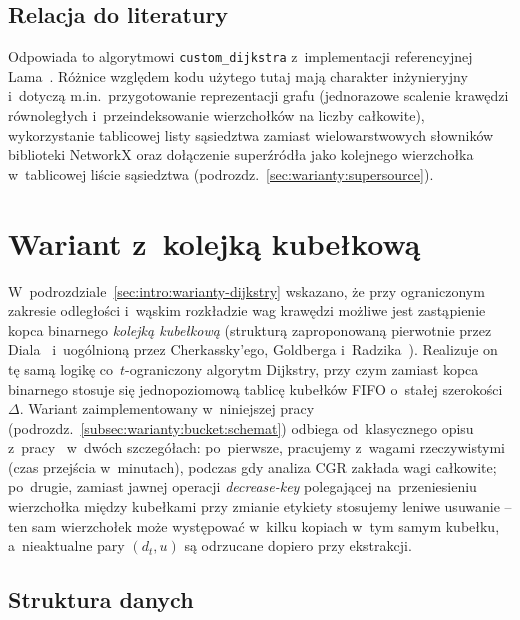 \subsection{Relacja do literatury}
\label{subsec:warianty:modified:relacja}

Odpowiada to algorytmowi \texttt{custom\_dijkstra} z~implementacji
referencyjnej Lama~\cite{Lam2024}. Różnice względem kodu użytego tutaj mają
charakter inżynieryjny i~dotyczą m.in.\
przygotowanie reprezentacji grafu (jednorazowe scalenie krawędzi równoległych
i~przeindeksowanie wierzchołków na liczby całkowite), wykorzystanie tablicowej
listy sąsiedztwa zamiast wielowarstwowych słowników biblioteki NetworkX
oraz dołączenie superźródła jako kolejnego wierzchołka w~tablicowej liście sąsiedztwa
(podrozdz.~\ref{sec:warianty:supersource}).

\section{Wariant z~kolejką kubełkową}
\label{sec:warianty:bucket}

W~podrozdziale~\ref{sec:intro:warianty-dijkstry} wskazano, że przy
ograniczonym zakresie odległości i~wąskim rozkładzie wag krawędzi możliwe
jest zastąpienie kopca binarnego \emph{kolejką kubełkową} (strukturą
zaproponowaną pierwotnie przez Diala~\cite{dial1969} i~uogólnioną przez
Cherkassky'ego, Goldberga i~Radzika~\cite{cherkassky1996}). Realizuje on tę samą logikę co~$t$-ograniczony algorytm Dijkstry, przy czym zamiast
kopca binarnego stosuje się jednopoziomową tablicę kubełków FIFO o~stałej
szerokości~$\Delta$. Wariant zaimplementowany w~niniejszej pracy
(podrozdz.~\ref{subsec:warianty:bucket:schemat}) odbiega od~klasycznego
opisu z~pracy~\cite{cherkassky1996} w~dwóch szczegółach: po~pierwsze,
pracujemy z~wagami rzeczywistymi (czas przejścia w~minutach), podczas
gdy analiza CGR zakłada wagi całkowite; po~drugie, zamiast jawnej
operacji \emph{decrease-key} polegającej na~przeniesieniu wierzchołka
między kubełkami przy zmianie etykiety stosujemy leniwe usuwanie -- ten
sam wierzchołek może występować w~kilku kopiach w~tym samym kubełku,
a~nieaktualne pary $(d_t,u)$ są odrzucane dopiero przy ekstrakcji.

\subsection{Struktura danych}
\label{subsec:warianty:bucket:struktura}

